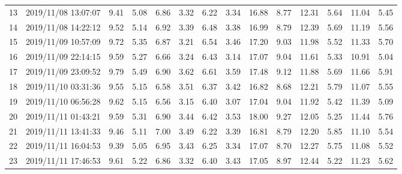 \documentclass[a4paper,12pt]{article}
\begin{document}
\begin{landscape}
\begin{table}[!h]
\begin{center}
\begin{tabular}{@{} l l c c c c c c c c c c c c}
13 & 2019/11/08 13:07:07 & 9.41 & 5.08 & 6.86 & 3.32 & 6.22 & 3.34 & 16.88 & 8.77 & 12.31 & 5.64 & 11.04 & 5.45 \\
14 & 2019/11/08 14:22:12 & 9.52 & 5.14 & 6.92 & 3.39 & 6.48 & 3.38 & 16.99 & 8.79 & 12.39 & 5.69 & 11.19 & 5.56 \\
15 & 2019/11/09 10:57:09 & 9.72 & 5.35 & 6.87 & 3.21 & 6.54 & 3.46 & 17.20 & 9.03 & 11.98 & 5.52 & 11.33 & 5.70 \\
16 & 2019/11/09 22:14:15 & 9.59 & 5.27 & 6.66 & 3.24 & 6.43 & 3.14 & 17.07 & 9.04 & 11.61 & 5.33 & 10.91 & 5.04 \\
17 & 2019/11/09 23:09:52 & 9.79 & 5.49 & 6.90 & 3.62 & 6.61 & 3.59 & 17.48 & 9.12 & 11.88 & 5.69 & 11.66 & 5.91 \\
18 & 2019/11/10 03:31:36 & 9.55 & 5.15 & 6.58 & 3.51 & 6.37 & 3.42 & 16.82 & 8.68 & 12.21 & 5.79 & 11.07 & 5.55 \\
19 & 2019/11/10 06:56:28 & 9.62 & 5.15 & 6.56 & 3.15 & 6.40 & 3.07 & 17.04 & 9.04 & 11.92 & 5.42 & 11.39 & 5.09 \\
20 & 2019/11/11 01:43:21 & 9.59 & 5.31 & 6.90 & 3.44 & 6.42 & 3.53 & 18.00 & 9.27 & 12.05 & 5.25 & 11.44 & 5.76 \\
21 & 2019/11/11 13:41:33 & 9.46 & 5.11 & 7.00 & 3.49 & 6.22 & 3.39 & 16.81 & 8.79 & 12.20 & 5.85 & 11.10 & 5.54 \\
22 & 2019/11/11 16:04:53 & 9.39 & 5.05 & 6.95 & 3.43 & 6.25 & 3.34 & 17.07 & 8.70 & 12.27 & 5.75 & 11.08 & 5.52 \\
23 & 2019/11/11 17:46:53 & 9.61 & 5.22 & 6.86 & 3.32 & 6.40 & 3.43 & 17.05 & 8.97 & 12.44 & 5.22 & 11.23 & 5.62
    \end{tabular}
 \label{tab:velocitymodel}
\end{center}
\end{table}

\end{landscape}
\end{document}
